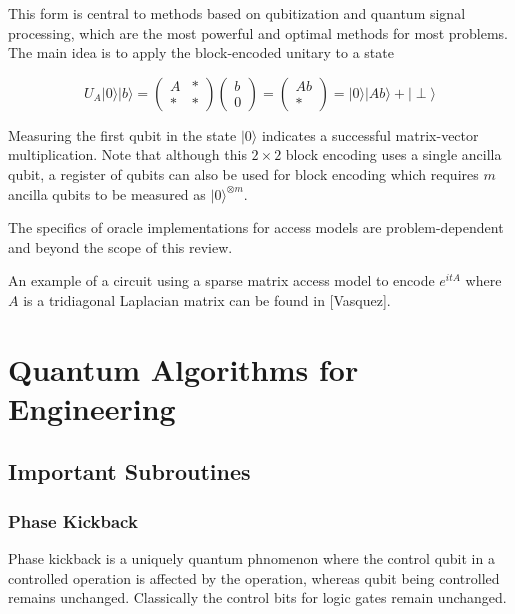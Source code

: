 \documentclass{article}
\begin{document}
This form is central to methods based on qubitization and quantum signal processing, which are the most powerful and optimal methods for most problems. The main idea is to apply the block-encoded unitary to a state



\begin{equation}
U_A \lvert 0 \rangle \lvert b \rangle = 
\begin{pmatrix}
 A & * \\ * & *
\end{pmatrix}
\begin{pmatrix}
b \\ 0
\end{pmatrix}
=
\begin{pmatrix}
Ab \\ *
\end{pmatrix}
=
\lvert 0 \rangle \lvert Ab \rangle + \lvert \perp \rangle
\end{equation}

Measuring the first qubit in the state $\lvert 0\rangle$ indicates a successful matrix-vector multiplication. Note that although this $2\times2$ block encoding uses a single ancilla qubit, a register of qubits can also be used for block encoding which requires $m$ ancilla qubits to be measured as $\lvert 0 \rangle ^ {\otimes m} $.

The specifics of oracle implementations for access models are problem-dependent and beyond the scope of this review.

An example of a circuit using a sparse matrix access model to encode $e^{itA}$ where $A$ is a tridiagonal Laplacian matrix can be found in [Vasquez].



\section{Quantum Algorithms for Engineering}

\subsection{Important Subroutines}

\subsubsection{Phase Kickback}

Phase kickback is a uniquely quantum phnomenon where the control qubit in a controlled operation is affected by the operation, whereas  qubit being controlled remains unchanged. Classically the control bits for logic gates remain unchanged.
\end{document}
